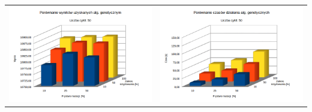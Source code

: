 \documentclass[pdflatex,11pt]{../aghdoc_version2}
\begin{document}
\begin{tabular}{cc}
\includegraphics[width=0.4\paperwidth]{pics/porownanie1/wynik50.png} & 
\includegraphics[width=0.4\paperwidth]{pics/porownanie1/czas50.png} \\
	

\end{tabular}
\end{document}
